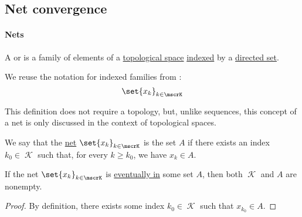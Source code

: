 \subsection{Net convergence}\label{subsec:net_convergence}

\paragraph{Nets}

\begin{definition}\label{def:topological_net}
  A  or  is a family of elements of a \hyperref[def:topological_space]{topological space} \hyperref[def:cartesian_product/indexed_family]{indexed} by a \hyperref[def:directed_set]{directed set}.

  We reuse the notation for indexed families from :
  \begin{equation*}
    \set{ x_k }_{k \in \mscrK}
  \end{equation*}
\end{definition}
\begin{comments}
  \item This definition does not require a topology, but, unlike sequences, this concept of a net is only discussed in the context of topological spaces.
\end{comments}

\begin{definition}\label{def:net_eventually_in}
  We say that the \hyperref[def:topological_net]{net} \( \set{ x_k }_{k \in \mscrK} \) is  the set \( A \) if there exists an index \( k_0 \in \mscrK \) such that, for every \( k \geq k_0 \), we have \( x_k \in A \).
\end{definition}

\begin{proposition}\label{thm:eventually_in_implies_nonempty}
  If the net \( \set{ x_k }_{k \in \mscrK} \) is \hyperref[def:net_eventually_in]{eventually in} some set \( A \), then both \( \mscrK \) and \( A \) are nonempty.
\end{proposition}
\begin{proof}
  By definition, there exists some index \( k_0 \in \mscrK \) such that \( x_{k_0} \in A \).
\end{proof}

